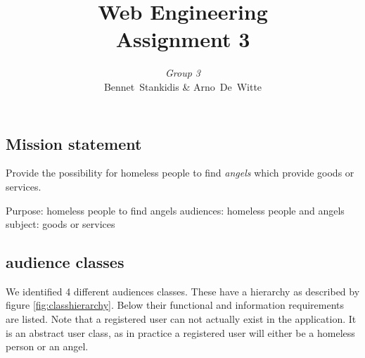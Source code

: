 \documentclass[a4paper]{report}
\author{\textit{Group 3}\\ Bennet~Stankidis \& Arno~De~Witte}
\title{{\Huge Web Engineering}\\Assignment 3}
\begin{document}
\maketitlepage
\tableofcontents

\chapter{}
\section{Mission statement}
Provide the possibility for homeless people to find \emph{angels} which provide goods or services.

Purpose: homeless people to find angels
audiences: homeless people and angels
subject: goods or services

\section{audience classes}
We identified 4 different audiences classes. These have a hierarchy as described by figure \ref{fig:classhierarchy}. Below their functional and information requirements are listed. Note that a registered user can not actually exist in the application. It is an abstract user class, as in practice a registered user will either be a homeless person or an angel.
\end{document}
